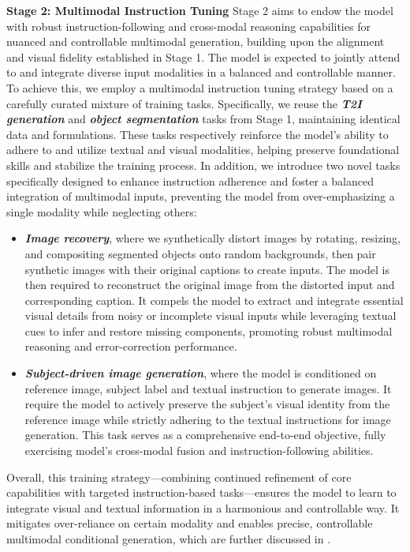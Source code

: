 \textbf{Stage 2: Multimodal Instruction Tuning}
Stage 2 aims to endow the model with robust instruction-following and cross-modal reasoning capabilities for nuanced and controllable multimodal generation, building upon the alignment and visual fidelity established in Stage 1. The model is expected to jointly attend to and integrate diverse input modalities in a balanced and controllable manner.
To achieve this, we employ a multimodal instruction tuning strategy based on a carefully curated mixture of training tasks. Specifically, we reuse the \emph{\textbf{T2I generation}} and \emph{\textbf{object segmentation}} tasks from Stage 1, maintaining identical data and formulations. These tasks respectively reinforce the model’s ability to adhere to and utilize textual and visual modalities, helping preserve foundational skills and stabilize the training process.
In addition, we introduce two novel tasks specifically designed to enhance instruction adherence and foster a balanced integration of multimodal inputs, preventing the model from over-emphasizing a single modality while neglecting others:
\begin{itemize}[left=2pt, itemsep=0.5pt,topsep=0.5pt]
    \item \emph{\textbf{Image recovery}}, where we synthetically distort images by rotating, resizing, and compositing segmented objects onto random backgrounds, then pair synthetic images with their original captions to create inputs. The model is then required to reconstruct the original image from the distorted input and corresponding caption. 
    It compels the model to extract and integrate essential visual details from noisy or incomplete visual inputs while leveraging textual cues to infer and restore missing components, promoting robust multimodal reasoning and error-correction performance.
    \item \emph{\textbf{Subject-driven image generation}}, where the model is conditioned on reference image, subject label and textual instruction to generate images. 
    It require the model to actively preserve the subject’s visual identity from the reference image while strictly adhering to the textual instructions for image generation. This task serves as a comprehensive end-to-end objective, fully exercising model’s cross-modal fusion and instruction-following abilities.
\end{itemize}
Overall, this training strategy—combining continued refinement of core capabilities with targeted instruction-based tasks—ensures the model to learn to integrate visual and textual information in a harmonious and controllable way. It mitigates over-reliance on certain modality and enables precise, controllable multimodal conditional generation, which are further discussed in . 


